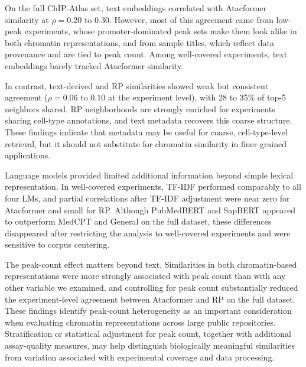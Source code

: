 \documentclass[12pt]{article}
\begin{document}
On the full ChIP-Atlas set, text embeddings correlated with Atacformer
similarity at $\rho = 0.20$ to $0.30$. However, most of this agreement came
from low-peak experiments, whose promoter-dominated peak sets make them look
alike in both chromatin representations, and from sample titles, which reflect
data provenance and are tied to peak count. Among well-covered experiments,
text embeddings barely tracked Atacformer similarity.

In contrast, text-derived and RP similarities showed weak but consistent
agreement ($\rho = 0.06$ to $0.10$ at the experiment level), with 28 to 35\%
of top-5 neighbors shared. RP neighborhoods are strongly enriched for
experiments sharing cell-type annotations, and text metadata recovers this
coarse structure. These findings indicate that metadata may be useful for
coarse, cell-type-level retrieval, but it should not substitute for chromatin
similarity in finer-grained applications.

Language models provided limited additional information beyond simple lexical
representation. In well-covered experiments, TF-IDF performed comparably to
all four LMs, and partial correlations after TF-IDF adjustment were near zero
for Atacformer and small for RP. Although PubMedBERT and SapBERT appeared to
outperform MedCPT and General on the full dataset, these differences
disappeared after restricting the analysis to well-covered experiments and
were sensitive to corpus centering.

The peak-count effect matters beyond text. Similarities in both
chromatin-based representations were more strongly associated with peak count
than with any other variable we examined, and controlling for peak count
substantially reduced the experiment-level agreement between Atacformer and RP
on the full dataset. These findings identify peak-count heterogeneity as an
important consideration when evaluating chromatin representations across
large public repositories. Stratification or statistical adjustment for peak
count, together with additional assay-quality measures, may help distinguish
biologically meaningful similarities from variation associated with
experimental coverage and data processing.
\end{document}

